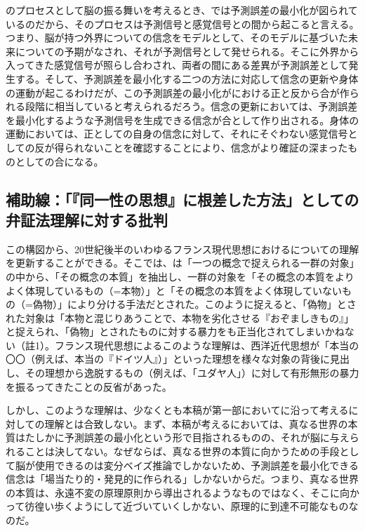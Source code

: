 のプロセスとして脳の振る舞いを考えるとき、では予測誤差の最小化が図られているのだから、そのプロセスは予測信号と感覚信号との間から起こると言える。つまり、脳が持つ外界についての信念をモデルとして、そのモデルに基づいた未来についての予期がなされ、それが予測信号として発せられる。そこに外界から入ってきた感覚信号が照らし合わされ、両者の間にある差異が予測誤差として発生する。そして、予測誤差を最小化する二つの方法に対応して信念の更新や身体の運動が起こるわけだが、この予測誤差の最小化がにおける正と反から合が作られる段階に相当していると考えられるだろう。信念の更新においては、予測誤差を最小化するような予測信号を生成できる信念が合として作り出される。身体の運動においては、正としての自身の信念に対して、それにそぐわない感覚信号としての反が得られないことを確認することにより、信念がより確証の深まったものとしての合になる。

\subsection{補助線：「『同一性の思想』に根差した方法」としての弁証法理解に対する批判}\label{ux88dcux52a9ux7ddaux540cux4e00ux6027ux306eux601dux60f3ux306bux6839ux5deeux3057ux305fux65b9ux6cd5ux3068ux3057ux3066ux306eux5f01ux8a3cux6cd5ux7406ux89e3ux306bux5bfeux3059ux308bux6279ux5224}

この構図から、20世紀後半のいわゆるフランス現代思想におけるについての理解を更新することができる。そこでは、は「一つの概念で捉えられる一群の対象」の中から、「その概念の本質」を抽出し、一群の対象を「その概念の本質をよりよく体現しているもの（=本物）」と「その概念の本質をよく体現していないもの（=偽物）」により分ける手法だとされた。このように捉えると、「偽物」とされた対象は「本物と混じりあうことで、本物を劣化させる『おぞましきもの』」と捉えられ、「偽物」とされたものに対する暴力をも正当化されてしまいかねない（註1）。フランス現代思想によるこのような理解は、西洋近代思想が「本当の〇〇（例えば、本当の『ドイツ人』）」といった理想を様々な対象の背後に見出し、その理想から逸脱するもの（例えば、「ユダヤ人」）に対して有形無形の暴力を振るってきたことの反省があった。

しかし、このような理解は、少なくとも本稿が第一部においてに沿って考えるに対しての理解とは合致しない。まず、本稿が考えるにおいては、真なる世界の本質はたしかに予測誤差の最小化という形で目指されるものの、それが脳に与えられることは決してない。なぜならば、真なる世界の本質に向かうための手段として脳が使用できるのは変分ベイズ推論でしかないため、予測誤差を最小化できる信念は「場当たり的・発見的に作られる」しかないからだ。つまり、真なる世界の本質は、永遠不変の原理原則から導出されるようなものではなく、そこに向かって彷徨い歩くようにして近づいていくしかない、原理的に到達不可能なものなのだ。

